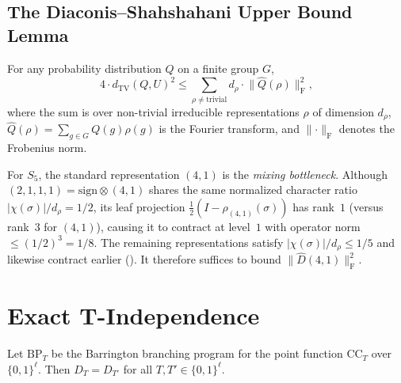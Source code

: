 \documentclass[version=submission]{iacrcc}
\newcommand{\norm}[1]{\lVert #1 \rVert}
\newcommand{\abs}[1]{\lvert #1 \rvert}
\newcommand{\frob}[1]{\norm{#1}_{\mathrm{F}}}
\newcommand{\dtv}{d_{\mathrm{TV}}}
\newcommand{\Dhat}{\widehat{D}}
\newcommand{\CC}{\mathrm{CC}}
\newcommand{\BP}{\mathrm{BP}}
\begin{document}
\subsection{The Diaconis--Shahshahani Upper Bound Lemma}

\begin{theorem}
\label{thm:ds}
For any probability distribution $Q$ on a finite group $G$,
\[
4 \cdot \dtv(Q, U)^2 \leq \sum_{\rho \neq \mathrm{trivial}}
d_\rho \cdot \frob{\widehat{Q}(\rho)}^2,
\]
where the sum is over non-trivial irreducible representations $\rho$ of
dimension $d_\rho$, $\widehat{Q}(\rho) = \sum_{g \in G} Q(g) \rho(g)$ is the
Fourier transform, and $\frob{\cdot}$ denotes the Frobenius norm.
\end{theorem}

For $S_5$, the standard representation $(4,1)$ is the \emph{mixing
bottleneck}. Although $(2,1,1,1) = \mathrm{sign} \otimes (4,1)$ shares the
same normalized character ratio $\abs{\chi(\sigma)}/d_\rho = 1/2$, its leaf
projection $\frac{1}{2}(I - \rho_{(4,1)}(\sigma))$ has rank~$1$ (versus
rank~$3$ for $(4,1)$), causing it to contract at level~$1$ with operator
norm $\leq (1/2)^3 = 1/8$. The remaining representations satisfy
$\abs{\chi(\sigma)}/d_\rho \leq 1/5$ and likewise contract earlier
(). It therefore suffices to
bound $\frob{\Dhat(4,1)}^2$.


\section{Exact T-Independence}
\label{sec:t-indep}

\begin{theorem}[T-Independence]
\label{thm:t-indep}
Let $\BP_T$ be the Barrington branching program for the point function $\CC_T$
over $\{0,1\}^\ell$. Then $D_T = D_{T'}$ for all $T, T' \in \{0,1\}^\ell$.
\end{theorem}
\end{document}
